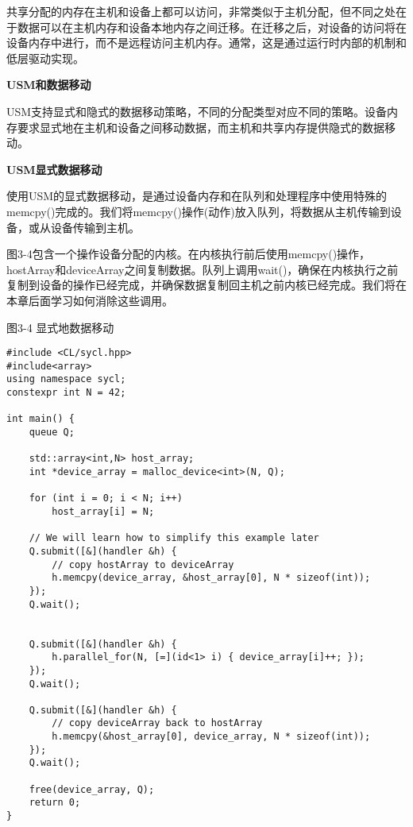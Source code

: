 共享分配的内存在主机和设备上都可以访问，非常类似于主机分配，但不同之处在于数据可以在主机内存和设备本地内存之间迁移。在迁移之后，对设备的访问将在设备内存中进行，而不是远程访问主机内存。通常，这是通过运行时内部的机制和低层驱动实现。\par

\hspace*{\fill} \par %
\textbf{USM和数据移动}

USM支持显式和隐式的数据移动策略，不同的分配类型对应不同的策略。设备内存要求显式地在主机和设备之间移动数据，而主机和共享内存提供隐式的数据移动。\par

\hspace*{\fill} \par %
\textbf{USM显式数据移动}

使用USM的显式数据移动，是通过设备内存和在队列和处理程序中使用特殊的memcpy()完成的。我们将memcpy()操作(动作)放入队列，将数据从主机传输到设备，或从设备传输到主机。\par

图3-4包含一个操作设备分配的内核。在内核执行前后使用memcpy()操作，hostArray和deviceArray之间复制数据。队列上调用wait()，确保在内核执行之前复制到设备的操作已经完成，并确保数据复制回主机之前内核已经完成。我们将在本章后面学习如何消除这些调用。\par

\hspace*{\fill} \par %
图3-4 显式地数据移动
\begin{lstlisting}[caption={}]
#include <CL/sycl.hpp>
#include<array>
using namespace sycl;
constexpr int N = 42; 

int main() {
	queue Q;
	
	std::array<int,N> host_array;
	int *device_array = malloc_device<int>(N, Q);
	
	for (int i = 0; i < N; i++)
		host_array[i] = N;
		
	// We will learn how to simplify this example later
	Q.submit([&](handler &h) {
		// copy hostArray to deviceArray
		h.memcpy(device_array, &host_array[0], N * sizeof(int));
	});
	Q.wait();
	
	
	Q.submit([&](handler &h) {
		h.parallel_for(N, [=](id<1> i) { device_array[i]++; }); 
	});
	Q.wait();
	
	Q.submit([&](handler &h) {
		// copy deviceArray back to hostArray
		h.memcpy(&host_array[0], device_array, N * sizeof(int)); 
	});
	Q.wait();
	
	free(device_array, Q);
	return 0;
}
\end{lstlisting}


